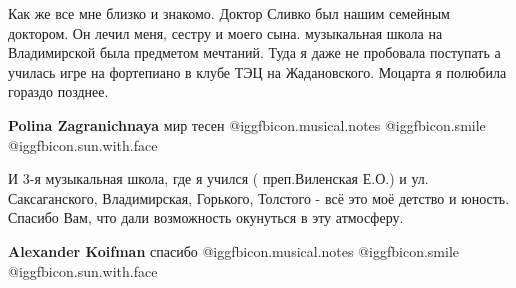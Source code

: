 \begin{itemize}

Как же все мне близко и знакомо. Доктор Сливко был нашим семейным доктором. Он
лечил меня, сестру и моего сына. музыкальная школа на Владимирской была предметом
мечтаний. Туда я даже не пробовала поступать а училась игре на фортепиано в
клубе ТЭЦ на Жадановского. Моцарта я полюбила гораздо позднее.

\begin{itemize} %
\textbf{Polina Zagranichnaya} мир тесен @igg{fbicon.musical.notes}  @igg{fbicon.smile}  @igg{fbicon.sun.with.face} 


И 3-я музыкальная школа, где я учился ( преп.Виленская Е.О.) и ул.
Саксаганского, Владимирская, Горького, Толстого - всё это моё детство и юность.
Спасибо Вам, что дали возможность окунуться в эту атмосферу.


\textbf{Alexander Koifman} спасибо @igg{fbicon.musical.notes}  @igg{fbicon.smile}  @igg{fbicon.sun.with.face} 
\end{itemize} %


\end{itemize} %
